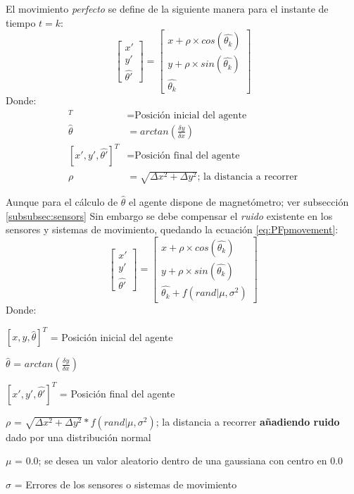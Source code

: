 El movimiento \emph{perfecto} se define de la siguiente manera para el instante de tiempo $t=k$:
\begin{equation}
\label{eq:PFpmovement}
\begin{bmatrix}
x'\\ 
y'\\ 
\hat{\theta'}
\end{bmatrix} = 
\begin{bmatrix}
x + \rho \times cos(\hat{\theta_k})\\
y + \rho \times sin(\hat{\theta_k})\\
\hat{\theta_k}
\end{bmatrix}
\end{equation}
Donde:
\begin{align*}
[x,y,\hat{\theta}]^T &= \text{Posición inicial del agente}\\
\hat{ \theta } &= arctan(\frac{\delta y}{\delta x})\\
[x',y',\hat{\theta'}]^T &= \text{Posición final del agente}\\
\rho &= \sqrt{\Delta x^2 + \Delta y^2}\text{; la distancia a recorrer}
\end{align*}

Aunque para el cálculo de $\hat{\theta}$ el agente dispone de magnetómetro; ver subsección \ref{subsubsec:sensors}
Sin embargo se debe compensar el \emph{ruido} existente en los sensores y sistemas de movimiento, quedando la ecuación \ref{eq:PFpmovement}:
\begin{equation}
\label{eq:PFnmovement}
\begin{bmatrix}
x'\\ 
y'\\ 
\hat{\theta'}
\end{bmatrix} = 
\begin{bmatrix}
x + \rho \times cos(\hat{\theta_k})\\
y + \rho \times sin(\hat{\theta_k})\\
\hat{\theta_k} + f(rand | \mu, \sigma^2)
\end{bmatrix}
\end{equation}
Donde:

\begin{minipage}{\columnwidth}
\begin{center}
\begin{description}
\item $[x,y,\hat{\theta}]^T$ = Posición inicial del agente
\item $\hat{ \theta }$ = $arctan(\frac{\delta y}{\delta x})$
\item $[x',y',\hat{\theta'}]^T$ = Posición final del agente
\item $\rho$ = $\sqrt{\Delta x^2 + \Delta y^2} * f(rand | \mu, \sigma^2)$; la distancia a recorrer \textbf{añadiendo ruido} dado por una distribución normal
\item $\mu$ = $0.0$; se desea un valor aleatorio dentro de una gaussiana con centro en 0.0
\item $\sigma$ = Errores de los sensores o sistemas de movimiento
\end{description}
\end{center}
\end{minipage}


